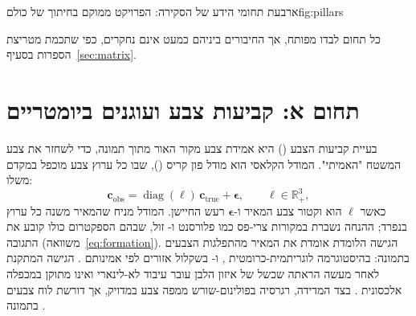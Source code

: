 \begin{reportfigure}{ארבעת תחומי הידע של הסקירה: הפרויקט ממוקם בחיתוך של כולם}{fig:pillars}
\end{reportfigure}

כל תחום לבדו מפותח, אך החיבורים ביניהם כמעט אינם נחקרים, כפי שתכמת מטריצת הספרות בסעיף~\ref{sec:matrix}.

\section{תחום א: קביעות צבע ועוגנים ביומטריים}
\label{sec:lit-color}

בעיית קביעות הצבע () היא אמידת צבע מקור האור מתוך תמונה, כדי לשחזר את צבע המשטח "האמיתי". המודל הקלאסי הוא מודל פון קריס (), שבו כל ערוץ צבע מוכפל במקדם משלו:
\begin{equation}
\mathbf{c}_{\text{obs}} = \operatorname{diag}(\boldsymbol{\ell})\,\mathbf{c}_{\text{true}} + \boldsymbol{\epsilon},
\qquad \boldsymbol{\ell} \in \mathbb{R}^{3}_{+},
\label{eq:vonkries}
\end{equation}
כאשר $\boldsymbol{\ell}$ הוא וקטור צבע המאיר ו-$\boldsymbol{\epsilon}$ רעש החיישן. המודל מניח שהמאיר משנה כל ערוץ בנפרד; ההנחה נשברת במקורות צרי-פס כמו פלורסנט ו- זול, שבהם הספקטרום כולו קובע את התגובה (משוואה~\eqref{eq:formation}). הגישה הלומדת אומדת את המאיר מהתפלגות הצבעים בתמונה:  בהיסטוגרמה לוגריתמית-כרומטית \cite{barron2017ffcc}, ו- בשקלול אזורים לפי אמינותם \cite{hu2017fc4}. הגישה המתקנת לאחר מעשה הראתה שכשל של איזון הלבן עובר עיבוד לא-לינארי ואינו מתוקן במכפלה אלכסונית \cite{afifi2019wb}. בצד המדידה, רגרסיה בפולינום-שורש ממפה צבע במדויק, אך דורשת לוח צבעים בתמונה \cite{finlayson2015rootpoly}.


